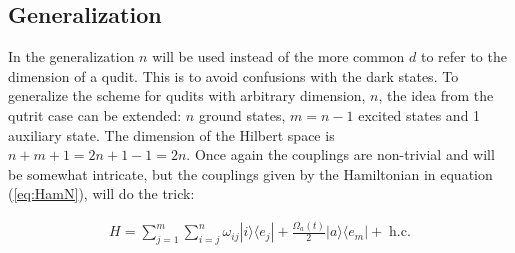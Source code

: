 \documentclass[pra,showpacs,priprent,twocolumn,superscriptaddress]{revtex4-1}
\newcommand{\ket}[1]{|#1\rangle}
\newcommand{\bra}[1]{\langle #1|}
\begin{document}
\subsection{Generalization} 
In the generalization $n$ will be used instead of the more common $d$ to refer to the dimension of a qudit. This is to avoid confusions with the dark states. To generalize the scheme for qudits with arbitrary dimension, $n$, the idea from the qutrit case can be extended: $n$ ground states, $m = n - 1$ excited states and 1 auxiliary state. The dimension of the Hilbert space is  $n + m + 1 = 2n + 1 -1 = 2n$. Once again the couplings are non-trivial and will be somewhat intricate, but the couplings given by the Hamiltonian in equation (\ref{eq:HamN}), will do the trick:

\begin{eqnarray}\label{eq:HamN}
H = \sum_{j = 1}^m \sum_{i = j}^n \omega_{ij} \ket{i}\bra{e_j} + \frac{\Omega_a(t)}{2}\ket{a}\bra{e_m} +\;\text{h.c}.
\end{eqnarray}
\end{document}
